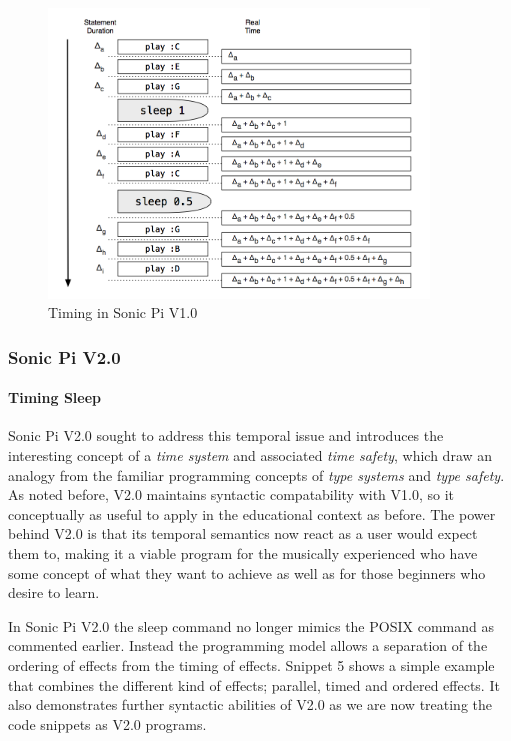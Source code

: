 \documentclass[11pt]{scrartcl}
\begin{document}
\begin{figure}[ht]
	\centering
	\includegraphics[width=0.9\textwidth]{images/sonic-one.png}
	\caption{Timing in Sonic Pi V1.0 \cite{AOB14}}
\end{figure}


\subsubsection{Sonic Pi V2.0}

\paragraph{Timing Sleep}
Sonic Pi V2.0 sought to address this temporal issue and introduces the 
interesting concept of a \emph{time system} and associated \emph{time safety}, 
which draw an analogy from the familiar programming concepts of \emph{type 
systems} and \emph{type safety}. As noted before, V2.0 maintains syntactic 
compatability with V1.0, so it conceptually as useful to apply in the 
educational context as before. The power behind V2.0 is that its temporal 
semantics now react as a user would expect them to, making it a viable program 
for the musically experienced who have some concept of what they want to 
achieve as well as for those beginners who desire to learn.

In Sonic Pi V2.0 the sleep command no longer mimics the POSIX command as 
commented earlier. Instead the programming model allows a separation of the 
ordering of effects from the timing of effects. Snippet 5 shows a simple 
example that combines the different kind of effects; parallel, timed and 
ordered effects. It also demonstrates further syntactic abilities of V2.0 as 
we are now treating the code snippets as V2.0 programs.
\end{document}
